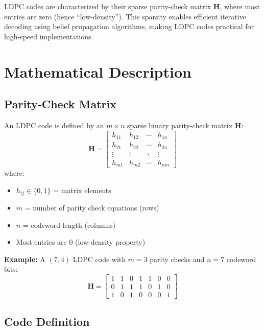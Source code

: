 LDPC codes are characterized by their sparse parity-check matrix $\mathbf{H}$, where most entries are zero (hence ``low-density''). This sparsity enables efficient iterative decoding using belief propagation algorithms, making LDPC codes practical for high-speed implementations.

\section{Mathematical Description}

\subsection{Parity-Check Matrix}

An LDPC code is defined by an $m \times n$ sparse binary parity-check matrix $\mathbf{H}$:
\begin{equation}
\mathbf{H} = \begin{bmatrix}
h_{11} & h_{12} & \cdots & h_{1n} \\
h_{21} & h_{22} & \cdots & h_{2n} \\
\vdots & \vdots & \ddots & \vdots \\
h_{m1} & h_{m2} & \cdots & h_{mn}
\end{bmatrix}
\end{equation}
where:
\begin{itemize}
\item $h_{ij} \in \{0, 1\}$ = matrix elements
\item $m$ = number of parity check equations (rows)
\item $n$ = codeword length (columns)
\item Most entries are $0$ (low-density property)
\end{itemize}

\textbf{Example:} A $(7,4)$ LDPC code with $m=3$ parity checks and $n=7$ codeword bits:
\begin{equation}
\mathbf{H} = \begin{bmatrix}
1 & 1 & 0 & 1 & 1 & 0 & 0 \\
0 & 1 & 1 & 1 & 0 & 1 & 0 \\
1 & 0 & 1 & 0 & 0 & 0 & 1
\end{bmatrix}
\end{equation}

\subsection{Code Definition}

